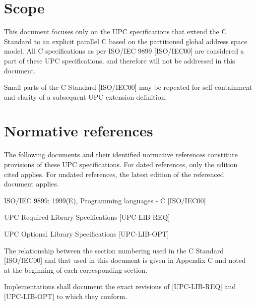 \section{Scope}

\npf This document focuses only on the UPC specifications
    that extend the C Standard to an explicit parallel C based on the
    partitioned global address space model. All C specifications as per
    ISO/IEC 9899 [ISO/IEC00] are considered a part of these UPC
    specifications, and therefore will not be addressed in this
    document.

\np Small parts of the C Standard [ISO/IEC00] may be repeated for
    self-containment and clarity of a subsequent UPC extension
    definition.

\section{Normative references}


\npf The following documents and their identified normative
     references constitute provisions of these UPC specifications.
     For dated references, only the edition cited applies. For undated references,
     the latest edition of the referenced document applies.

\np ISO/IEC 9899: 1999(E), Programming languages - C
    [ISO/IEC00]

\np UPC Required Library Specifications
    [UPC-LIB-REQ]

\np UPC Optional Library Specifications
    [UPC-LIB-OPT]

\np The relationship between the section numbering used in
    the C Standard [ISO/IEC00] and that used in this document is given
    in Appendix C and noted at the beginning of each corresponding section.

\np Implementations shall document the exact revisions of 
    [UPC-LIB-REQ] and [UPC-LIB-OPT] to which they conform.

